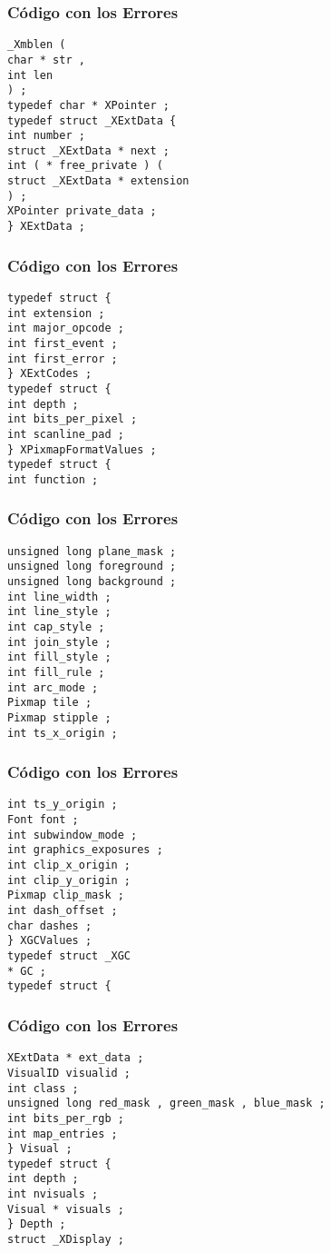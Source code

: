 \documentclass{beamer}
\begin{document}
\begin{frame}[fragile]
\frametitle{C\'odigo con los Errores}
\begin{verbatim}
_Xmblen ( 
char * str , 
int len 
) ; 
typedef char * XPointer ; 
typedef struct _XExtData { 
int number ; 
struct _XExtData * next ; 
int ( * free_private ) ( 
struct _XExtData * extension 
) ; 
XPointer private_data ; 
} XExtData ; 
\end{verbatim}
\end{frame}
\begin{frame}[fragile]
\frametitle{C\'odigo con los Errores}
\begin{verbatim}
typedef struct { 
int extension ; 
int major_opcode ; 
int first_event ; 
int first_error ; 
} XExtCodes ; 
typedef struct { 
int depth ; 
int bits_per_pixel ; 
int scanline_pad ; 
} XPixmapFormatValues ; 
typedef struct { 
int function ; 
\end{verbatim}
\end{frame}
\begin{frame}[fragile]
\frametitle{C\'odigo con los Errores}
\begin{verbatim}
unsigned long plane_mask ; 
unsigned long foreground ; 
unsigned long background ; 
int line_width ; 
int line_style ; 
int cap_style ; 
int join_style ; 
int fill_style ; 
int fill_rule ; 
int arc_mode ; 
Pixmap tile ; 
Pixmap stipple ; 
int ts_x_origin ; 
\end{verbatim}
\end{frame}
\begin{frame}[fragile]
\frametitle{C\'odigo con los Errores}
\begin{verbatim}
int ts_y_origin ; 
Font font ; 
int subwindow_mode ; 
int graphics_exposures ; 
int clip_x_origin ; 
int clip_y_origin ; 
Pixmap clip_mask ; 
int dash_offset ; 
char dashes ; 
} XGCValues ; 
typedef struct _XGC 
* GC ; 
typedef struct { 
\end{verbatim}
\end{frame}
\begin{frame}[fragile]
\frametitle{C\'odigo con los Errores}
\begin{verbatim}
XExtData * ext_data ; 
VisualID visualid ; 
int class ; 
unsigned long red_mask , green_mask , blue_mask ; 
int bits_per_rgb ; 
int map_entries ; 
} Visual ; 
typedef struct { 
int depth ; 
int nvisuals ; 
Visual * visuals ; 
} Depth ; 
struct _XDisplay ; 
\end{verbatim}
\end{frame}
\end{document}
